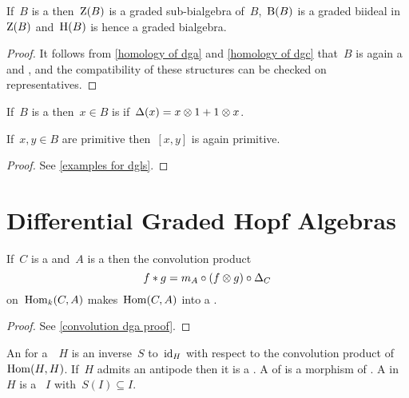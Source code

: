 \documentclass[a4paper,10pt,headings=standardclasses]{scrartcl}
\begin{document}
\begin{proposition}
  If~$B$ is a {\dgb} then~$\operatorname{Z}(B)$ is a graded sub-bialgebra of~$B$,~$\operatorname{B}(B)$ is a graded biideal in~$\operatorname{Z}(B)$ and~$\operatorname{H}(B)$ is hence a graded bialgebra.
\end{proposition}

\begin{proof}
  It follows from \cref{homology of dga} and \cref{homology of dgc} that~$B$ is again a {\dga} and {\dgc}, and the compatibility of these structures can be checked on representatives.
\end{proof}

\begin{definition}
  If~$B$ is a {\dgb} then~$x \in B$ is  if~$\Delta(x) = x \otimes 1 + 1 \otimes x$.
\end{definition}

\begin{lemma}
  If~$x, y \in B$ are primitive then~$[x,y]$ is again primitive.
\end{lemma}

\begin{proof}
  See \cref{examples for dgls}.
\end{proof}







\section{Differential Graded Hopf Algebras}

\begin{lemma}
  \label{convolution dga}
  If~$C$ is a {\dgc} and~$A$ is a {\dga} then the convolution product
  \[
    f * g
    =
    m_A \circ (f \otimes g) \circ \Delta_C
  \]
  on~$\operatorname{Hom}_k(C,A)$ makes~$\operatorname{Hom}(C,A)$ into a {\dga}.
\end{lemma}

\begin{proof}
  See \cref{convolution dga proof}.
\end{proof}

\begin{definition}
  An  for a~{\dgb}~$H$ is an inverse~$S$ to~$\operatorname{id}_H$ with respect to the convolution product of~$\operatorname{Hom}(H,H)$.
  If~$H$ admits an antipode then it is a .
  A  of {\dghs} is a morphism of {\dgbs}.
  A  in~$H$ is a {\dgbi}~$I$ with~$S(I) \subseteq I$.
\end{definition}
\end{document}
